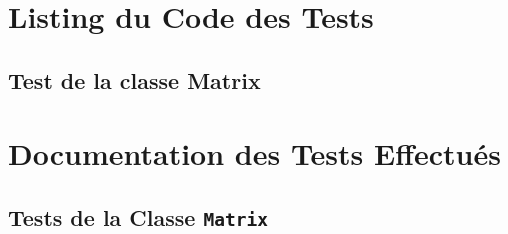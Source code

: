 \documentclass[12pt, a4paper, onecolumn]{article}
\begin{document}
	\section{Listing du Code des Tests}
	\subsection{Test de la classe Matrix}

	
	

	\newpage
	
	\section{Documentation des Tests Effectués}
	\subsection{Tests de la Classe \texttt{Matrix}}
	
\end{document}
